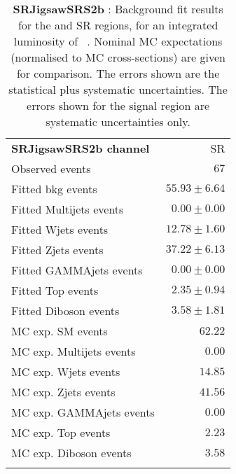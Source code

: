 

\begin{table}
\begin{center}
\setlength{\tabcolsep}{0.0pc}
{\tiny
\begin{tabular*}{\textwidth}{@{\extracolsep{\fill}}lr}
\noalign{\smallskip}\hline\noalign{\smallskip}
{\bf SRJigsawSRS2b channel}           & SR              \\[-0.05cm]
\noalign{\smallskip}\hline\noalign{\smallskip}
Observed events          & $67$                    \\
\noalign{\smallskip}\hline\noalign{\smallskip}
Fitted bkg events         & $55.93 \pm 6.64$              \\
\noalign{\smallskip}\hline\noalign{\smallskip}
        Fitted Multijets events         & $0.00 \pm 0.00$              \\
        Fitted Wjets events         & $12.78 \pm 1.60$              \\
        Fitted Zjets events         & $37.22 \pm 6.13$              \\
        Fitted GAMMAjets events         & $0.00 \pm 0.00$              \\
        Fitted Top events         & $2.35 \pm 0.94$              \\
        Fitted Diboson events         & $3.58 \pm 1.81$              \\
 \noalign{\smallskip}\hline\noalign{\smallskip}
MC exp. SM events              & $62.22$              \\
\noalign{\smallskip}\hline\noalign{\smallskip}
        MC exp. Multijets events         & $0.00$              \\
        MC exp. Wjets events         & $14.85$              \\
        MC exp. Zjets events         & $41.56$              \\
        MC exp. GAMMAjets events         & $0.00$              \\
        MC exp. Top events         & $2.23$              \\
        MC exp. Diboson events         & $3.58$              \\
\noalign{\smallskip}\hline\noalign{\smallskip}
\end{tabular*}
}
\end{center}
\caption{{\bf SRJigsawSRS2b} : Background fit results for the  and SR regions, for an integrated luminosity of \ourintlumi~\ifb. Nominal MC expectations (normalised to MC cross-sections) are given for comparison. The errors shown are the statistical plus systematic uncertainties. The errors shown for the signal region are systematic uncertainties only.}
\label{table.results.systematics.in.logL.fit.SR.SRJigsawSRS2b}
\end{table}
%